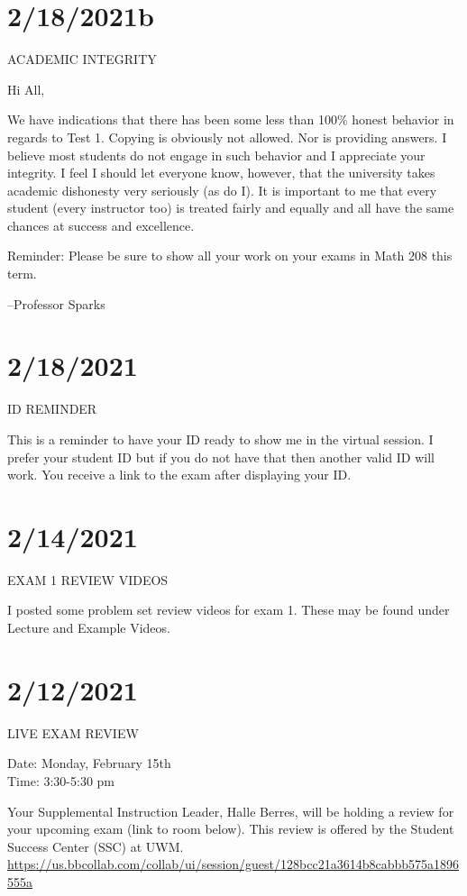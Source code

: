 \documentclass[]{article}
\begin{document}
	
\section*{2/18/2021b}
ACADEMIC INTEGRITY

Hi All,

We have indications that there has been some less than 100\% honest behavior in regards to Test 1. Copying is obviously not allowed. Nor is providing answers. I believe most students do not engage in such behavior and I appreciate your integrity. I feel I should let everyone know, however, that the university takes academic dishonesty very seriously (as do I). It is important to me that every student (every instructor too) is treated fairly and equally and all have the same chances at success and excellence.

Reminder: Please be sure to show all your work on your exams in Math 208 this term.

--Professor Sparks
	
\section*{2/18/2021}
ID REMINDER

This is a reminder to have your ID ready to show me in the virtual session. I prefer your student ID but if you do not have that then another valid ID will work. You receive a link to the exam after  displaying your ID.
	
\section*{2/14/2021}
EXAM 1 REVIEW VIDEOS

I posted some problem set review videos for exam 1. These may be found under Lecture and Example Videos.
	
\section*{2/12/2021}
LIVE EXAM REVIEW

Date: Monday, February 15th \\
Time: 3:30-5:30 pm

Your Supplemental Instruction Leader, Halle Berres, will be holding a review for your upcoming exam (link to room below). This review is offered by the Student Success Center (SSC) at UWM. \url{https://us.bbcollab.com/collab/ui/session/guest/128bcc21a3614b8cabbb575a1896555a}
\end{document}
